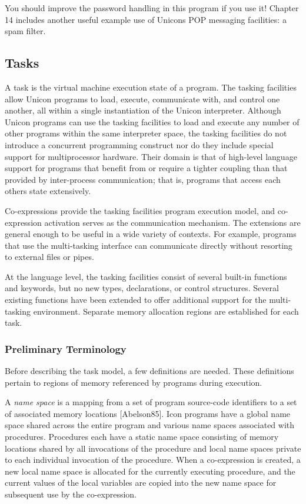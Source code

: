 You should improve the password handling in this program if you use it!
Chapter 14 includes another useful example use of
Unicon{\textquotesingle}s POP messaging facilities: a spam filter.

\subsection{Tasks}

A task is the virtual machine execution state of a program. The tasking
facilities allow Unicon programs to load, execute, communicate with,
and control one another, all within a single instantiation of the
Unicon interpreter. 
Although Unicon programs can use the tasking facilities to load and
execute any number of other programs within the same interpreter space,
the tasking facilities do not introduce a concurrent programming
construct nor do they include special support for multiprocessor
hardware. Their domain is that of high-level language support for
programs that benefit from or require a tighter coupling than that
provided by inter-process communication; that is, programs that access
each other{\textquotesingle}s state extensively.

Co-expressions provide the tasking facilities{\textquotesingle} program
execution model, and co-expression activation serves as the
communication mechanism. The extensions are general enough to be useful
in a wide variety of contexts. For example, programs that use the
multi-tasking interface can communicate directly without resorting to
external files or pipes.

At the language level, the tasking facilities consist of several
built-in functions and keywords, but no new types, declarations, or
control structures. Several existing functions have been extended to
offer additional support for the multi-tasking environment. 
Separate memory allocation regions are established for each task. 

\subsubsection[Preliminary Terminology]{Preliminary Terminology}

Before describing the task model, a few definitions are needed. These
definitions pertain to regions of memory referenced by programs during
execution. 

A \textit{name space} is a mapping from a set of program source-code
identifiers to a set of associated memory locations [Abelson85]. Icon
programs have a global name space shared across the entire program and
various name spaces associated with procedures. Procedures each have a
static name space consisting of memory locations shared by all
invocations of the procedure and local name spaces private to each
individual invocation of the procedure.
When a co-expression is created, a new local name space is allocated for
the currently executing procedure, and the current values of the local
variables are copied into the new name space for subsequent use by the
co-expression. 

